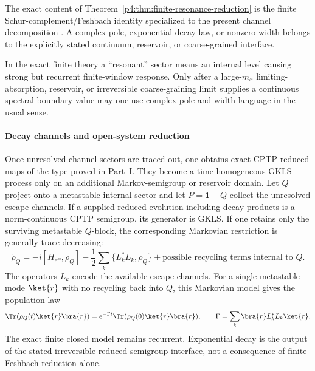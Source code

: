 \documentclass[12pt,a4paper]{article}
\begin{document}
\begin{remark}
\label{p4:rem:finite-resonance-status}
The exact content of
Theorem~\ref{p4:thm:finite-resonance-reduction} is the finite
Schur-complement/Feshbach identity specialized to the present channel
decomposition \cite{Feshbach1958,Feshbach1962}.  A complex pole, exponential
decay law, or nonzero width belongs to the explicitly stated continuum,
reservoir, or coarse-grained interface.
\end{remark}

\begin{remark}
\label{p4:rem:resonance-meaning}
In the exact finite theory a ``resonant'' sector means an internal level
causing strong but recurrent finite-window response.  Only after a
large-\(m_x\) limiting-absorption, reservoir, or irreversible coarse-graining
limit supplies a continuous spectral boundary value may one use complex-pole
and width language in the usual sense.
\end{remark}



\paragraph{Decay channels and open-system reduction}
\label{p4:sec:part2-decay-channels}

Once unresolved channel sectors are traced out, one obtains exact CPTP
reduced maps of the type proved in Part~I.  They become a time-homogeneous
GKLS process only on an additional Markov-semigroup or reservoir domain.
Let $Q$ project onto a metastable internal sector and let $P=\mathbf 1-Q$ collect the unresolved escape channels.
If a supplied reduced evolution including decay products is a
norm-continuous CPTP semigroup, its generator is GKLS.  If one retains only
the surviving metastable \(Q\)-block, the corresponding Markovian restriction
is generally trace-decreasing:
\begin{equation}
\label{p4:eq:resonance-gkls}
\dot\rho_Q
=
-i[H_{\mathrm{eff}},\rho_Q]
-
\frac12\sum_k\{L_k^*L_k,\rho_Q\}
+
\text{possible recycling terms internal to }Q.
\end{equation}
The operators \(L_k\) encode the available escape channels.  For a single
metastable mode \(\ket{r}\) with no recycling back into \(Q\), this Markovian
model gives the population law
\begin{equation}
\label{p4:eq:exponential-decay}
\Tr(\rho_Q(t)\ket{r}\bra{r})
=e^{-\Gamma t}\Tr(\rho_Q(0)\ket{r}\bra{r}),
\qquad
\Gamma=\sum_k \bra{r}L_k^*L_k\ket{r}.
\end{equation}
The exact finite closed model remains recurrent.  Exponential decay is the
output of the stated irreversible reduced-semigroup interface, not a
consequence of finite Feshbach reduction alone.
\end{document}
